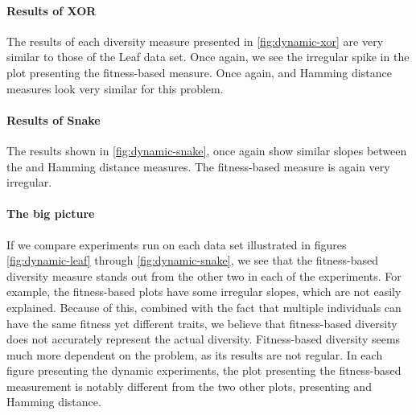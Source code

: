 

\paragraph{Results of XOR} The results of each diversity measure presented in \cref{fig:dynamic-xor} are very similar to those of the Leaf data set. Once again, we see the irregular spike in the plot presenting the fitness-based measure. Once again, \dia{} and Hamming distance measures look very similar for this problem.%



\paragraph{Results of Snake} The results shown in \cref{fig:dynamic-snake}, once again show similar slopes between the \dia{} and Hamming distance measures. The fitness-based measure is again very irregular.



\paragraph{The big picture} If we compare experiments run on each data set illustrated in figures \ref{fig:dynamic-leaf} through \ref{fig:dynamic-snake}, we see that the fitness-based diversity measure stands out from the other two in each of the experiments. For example, the fitness-based plots have some irregular slopes, which are not easily explained. Because of this, combined with the fact that multiple individuals can have the same fitness yet different traits, we believe that fitness-based diversity does not accurately represent the actual diversity. Fitness-based diversity seems much more dependent on the problem, as its results are not regular. In each figure presenting the dynamic experiments, the plot presenting the fitness-based measurement is notably different from the two other plots, presenting \dia{} and Hamming distance.

